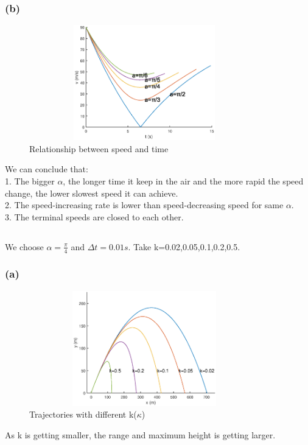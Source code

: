 \documentclass{article}
\begin{document}
\subsubsection*{(b)}
\begin{figure}[!htb] 
\centering 
\includegraphics[height=5cm,width=10cm]{linear_figure3_2.eps}
\caption{Relationship between speed and time}
\end{figure}
\noindent We can conclude that:\\
1. The bigger $\alpha$, the longer time it keep in the air and the more rapid the speed change, the lower slowest speed it can achieve.\\
2. The speed-increasing rate is lower than speed-decreasing speed for same $\alpha$.\\
3. The terminal speeds are closed to each other.
\subsection{}
\noindent
We choose $\alpha=\frac{\pi}{4}$ and $\Delta t=0.01s$. Take k=0.02,0.05,0.1,0.2,0.5.
\subsubsection*{(a)}
\begin{figure}[!htb] 
\centering
\includegraphics[height=5cm,width=10cm]{linear_figure4_1.eps}
\caption{Trajectories with different k($\kappa$)}
\end{figure}
\noindent As k is getting smaller, the range and maximum height is getting larger.
\newpage
\end{document}
